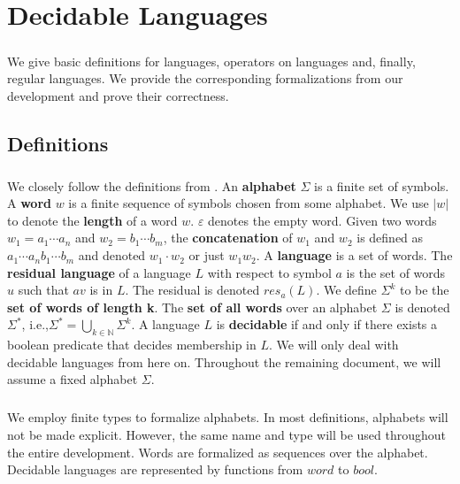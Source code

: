 \chapter{Decidable Languages}
\label{chap:lang}

\paragraph{}
We give basic definitions for languages, operators on languages and, finally, regular languages.
We provide the corresponding formalizations from our development and prove their correctness.

\section{Definitions}
\paragraph{}
We closely follow the definitions from \cite{DBLP:books/daglib/0011126}.
An \textbf{alphabet} $\Sigma$ is a finite set of symbols. 
A \textbf{word} $w$ is a finite sequence of symbols chosen from some alphabet. 
We use $|w|$ to denote the \textbf{length} of a word $w$. $\varepsilon$ denotes the empty word.
Given two words $w_1 = a_1 \cdots a_n$ and $w_2 = b_1 \cdots b_m$, the \textbf{concatenation} of $w_1$ and $w_2$ is defined as $a_1 \cdots a_n b_1 \cdots b_m$ and denoted $w_1 \cdot w_2$ or just $w_1 w_2$.
A \textbf{language} is a set of words.
The \textbf{residual language} of a language $L$ with respect to symbol $a$ is the set of words $u$ such that $a v$ is in $L$. The residual is denoted $res_a(L)$.
We define $\Sigma^k$ to be the \textbf{set of words of length k}.
The \textbf{set of all words} over an alphabet $\Sigma$ is denoted $\Sigma^*$, i.e.,$\Sigma^* = \bigcup_{k \in \mathbb{N}} \Sigma^k$.
A language $L$ is \textbf{decidable} if and only if there exists a boolean predicate that decides membership in $L$.
We will only deal with decidable languages from here on.
Throughout the remaining document, we will assume a fixed alphabet $\Sigma$.

    \paragraph{} 
    We employ finite types to formalize alphabets. 
    In most definitions, alphabets will not be made explicit.
    However, the same name and type will be used throughout the entire development.
    Words are formalized as sequences over the alphabet.
    Decidable languages are represented by functions from $word$ to $bool$.

